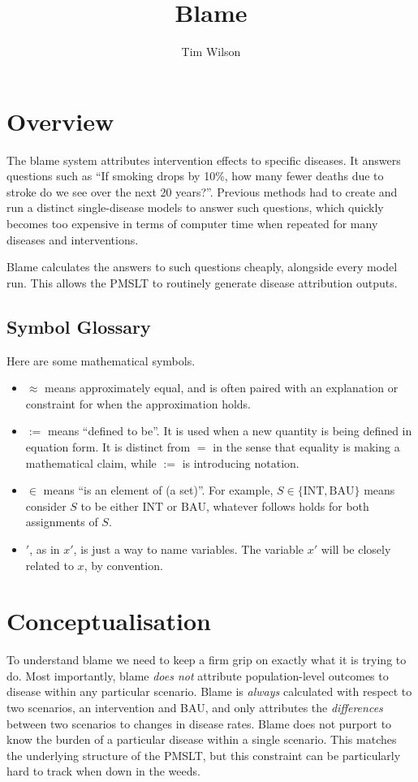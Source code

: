 \documentclass[]{article}
\title{Blame}
\author{Tim Wilson}
\begin{document}
	
\maketitle

\section{Overview}

The blame system attributes intervention effects to specific diseases. It answers questions such as ``If smoking drops by 10\%, how many fewer deaths due to stroke do we see over the next 20 years?''. Previous methods had to create and run a distinct single-disease models to answer such questions, which quickly becomes too expensive in terms of computer time when repeated for many diseases and interventions. 

Blame calculates the answers to such questions cheaply, alongside every model run. This allows the PMSLT to routinely generate disease attribution outputs.

\subsection{Symbol Glossary}
Here are some mathematical symbols.
\begin{itemize}
	\item $\approx$ means approximately equal, and is often paired with an explanation or constraint for when the approximation holds.
	\item $:=$ means ``defined to be''. It is used when a new quantity is being defined in equation form. It is distinct from $=$ in the sense that equality is making a mathematical claim, while $:=$ is introducing notation.
	\item $\in$ means ``is an element of (a set)''. For example, $S \in \{\text{INT}, \text{BAU}\}$ means consider $S$ to be either $\text{INT}$ or $\text{BAU}$, whatever follows holds for both assignments of $S$.
	\item $'$, as in $x'$, is just a way to name variables. The variable $x'$ will be closely related to $x$, by convention.
\end{itemize}

\section{Conceptualisation}

To understand blame we need to keep a firm grip on exactly what it is trying to do. Most importantly, blame \textit{does not} attribute population-level outcomes to disease within any particular scenario. Blame is \textit{always} calculated with respect to two scenarios, an intervention and BAU, and only attributes the \textit{differences} between two scenarios to changes in disease rates. Blame does not purport to know the burden of a particular disease within a single scenario. This matches the underlying structure of the PMSLT, but this constraint can be particularly hard to track when down in the weeds.
\end{document}
